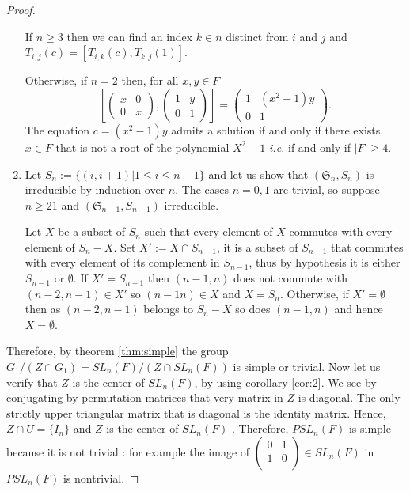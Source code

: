 \begin{proof}
\begin{enumerate}
            If $n\ge 3$ then we can find an index $k \in n$ distinct from $i$ and $j$ and $T_{i,j}\left( c \right)= [T_{i,k}(c), T_{k,j}(1)]$.

            Otherwise, if $n=2$ then, for all $x, y \in F$
    $$\left[ \begin{pmatrix} x & 0 \\ 0 & x \end{pmatrix}, \begin{pmatrix} 1 & y \\ 0 &1 \end{pmatrix} \right] = \begin{pmatrix} 1 & (x^2-1) y \\ 0 & 1 \end{pmatrix}.$$
    The equation $c = \left( x^2 -1  \right) y$ admits a solution if and only if there exists $x\in F$ that is not a root of the polynomial $X^2-1$ \textit{i.e.} if and only if $|F| \ge 4$.

        \item Let $S_n := \{(i,i+1) | 1\le i\le n-1\}$ and let us show that $\left( \mathfrak{S}_n,S_n \right)$ is irreducible by induction over $n$.
            The cases $n=0,1$ are trivial, so suppose $n\ge21$ and $\left( \mathfrak{S}_{n-1}, S_{n-1} \right)$ irreducible.

            Let $X$ be a subset of $S_n$ such that every element of $X$ commutes with every element of $S_n -X$. Set $X' := X \cap S_{n-1}$, it is a subset of $S_{n-1}$ that commutes with every element of its complement in $S_{n-1}$, thus by hypothesis it is either $S_{n-1}$ or $\emptyset$. If $X' = S_{n-1}$ then $\left( n-1,n \right)$ does not commute with $(n-2,n-1) \in X'$ so $\left( n-1n \right)\in X$ and $X = S_n$. Otherwise, if $X' = \emptyset$ then as $\left( n-2,n-1 \right)$ belongs to $S_n -X$ so does $\left( n-1,n \right)$ and hence $X=\emptyset$.
    \end{enumerate}

    Therefore, by theorem \ref{thm:simple} the group $G_1 / (Z \cap G_1) = SL_n(F) / \left( Z \cap SL_n\left( F \right) \right)$ is simple or trivial.
    Now let us verify that $Z$ is the center of $SL_n\left( F \right)$, by using corollary \ref{cor:2}. We see by conjugating by permutation matrices that very matrix in $Z$ is diagonal. The only strictly upper triangular matrix that is diagonal is the identity matrix. Hence, $Z \cap U = \{I_n\}$ and $Z$ is the center of $SL_n\left( F \right)$ . Therefore, $PSL_n\left( F \right)$ is simple because it is not trivial : for example the image of $\left( \begin{smallmatrix}
            0 & 1 \\ 1 & 0\\
    \end{smallmatrix}
     \right) \in SL_n\left( F \right)$ in $PSL_n(F)$ is nontrivial.
\end{proof} 

